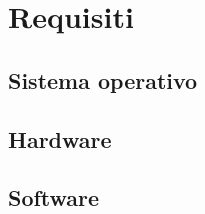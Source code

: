 \documentclass[../ClipsManualeUtente.tex]{subfiles}
\begin{document}
\section{Requisiti}
	
	\subsection{Sistema operativo}
	
	\subsection{Hardware}
	
	\subsection{Software}
\end{document}
